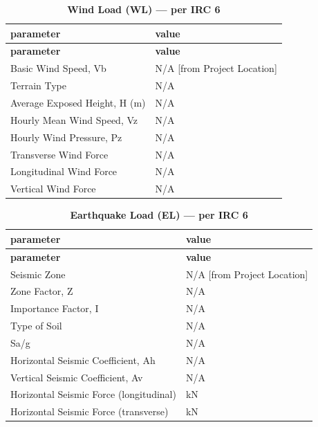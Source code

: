 \documentclass[12pt,a4paper]{report}
\numberwithin{table}{chapter}
\numberwithin{figure}{chapter}
\newcommand{\ReportTableSetup}{%
  \setlength{\tabcolsep}{3.0pt}%
  \renewcommand{\arraystretch}{1.18}%
  \setlength{\arrayrulewidth}{0.4pt}\setlength{\extrarowheight}{0.5pt}%
  \setlength{\LTleft}{\fill}\setlength{\LTright}{\fill}%
  \setlength{\LTpre}{4pt}\setlength{\LTpost}{8pt}}
\newcommand{\ReportTableFont}{\small}
\newcommand{\ReportRowGap}{3.0pt}
\newcommand{\ReportTableGap}{\vspace{0.5em}}
\begin{document}
\ReportTableGap
\begingroup
\ReportTableSetup
\ReportTableFont
\begin{longtable}{|L{5.5000cm}|p{10.0000cm}|}
\caption{\textbf{Wind Load (WL) --- per IRC 6}}\\
\hline
\textbf{parameter} & \textbf{value} \\
\hline
\endfirsthead
\hline
\textbf{parameter} & \textbf{value} \\
\hline
\endhead
\hline
\endfoot
\hline
\endlastfoot

\textnormal{Basic Wind Speed, Vb} & N/A [from Project Location] \\[\ReportRowGap]
\hline
\textnormal{Terrain Type} & N/A \\[\ReportRowGap]
\hline
\textnormal{Average Exposed Height, H (m)} & N/A \\[\ReportRowGap]
\hline
\textnormal{Hourly Mean Wind Speed, Vz} & N/A \\[\ReportRowGap]
\hline
\textnormal{Hourly Wind Pressure, Pz} & N/A \\[\ReportRowGap]
\hline
\textnormal{Transverse Wind Force} & N/A \\[\ReportRowGap]
\hline
\textnormal{Longitudinal Wind Force} & N/A \\[\ReportRowGap]
\hline
\textnormal{Vertical Wind Force} & N/A \\[\ReportRowGap]
\hline
\end{longtable}
\endgroup

\ReportTableGap
\begingroup
\ReportTableSetup
\ReportTableFont
\begin{longtable}{|L{5.5000cm}|p{10.0000cm}|}
\caption{\textbf{Earthquake Load (EL) --- per IRC 6}}\\
\hline
\textbf{parameter} & \textbf{value} \\
\hline
\endfirsthead
\hline
\textbf{parameter} & \textbf{value} \\
\hline
\endhead
\hline
\endfoot
\hline
\endlastfoot

\textnormal{Seismic Zone} & N/A [from Project Location] \\[\ReportRowGap]
\hline
\textnormal{Zone Factor, Z} & N/A \\[\ReportRowGap]
\hline
\textnormal{Importance Factor, I} & N/A \\[\ReportRowGap]
\hline
\textnormal{Type of Soil} & N/A \\[\ReportRowGap]
\hline
\textnormal{Sa/g} & N/A \\[\ReportRowGap]
\hline
\textnormal{Horizontal Seismic Coefficient, Ah} & N/A \\[\ReportRowGap]
\hline
\textnormal{Vertical Seismic Coefficient, Av} & N/A \\[\ReportRowGap]
\hline
\textnormal{Horizontal Seismic Force (longitudinal)} &  kN \\[\ReportRowGap]
\hline
\textnormal{Horizontal Seismic Force (transverse)} &  kN \\[\ReportRowGap]
\hline
\end{longtable}
\endgroup
\end{document}
